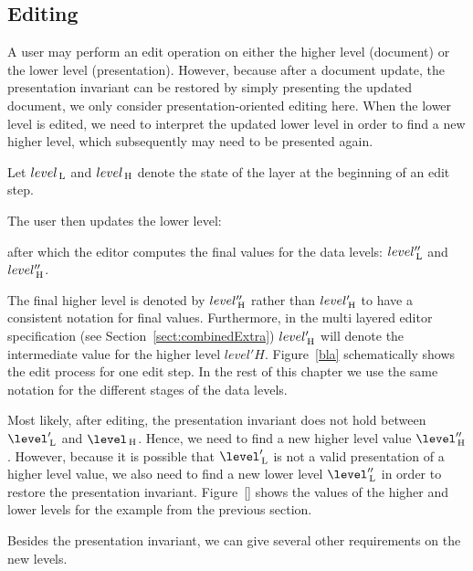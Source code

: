 

\subsection{Editing}\label{sect:single_Editing}

A user may perform an edit operation on either the higher level (document) or the lower level (presentation). However, because after a document update, the presentation invariant can be restored by simply presenting the updated document, we only consider presentation-oriented editing here. When the lower level is edited, we need to interpret the updated lower level in order to find a new higher level, which subsequently may need to be presented again.


Let $level_{\, \mathrm L}$ and $level_{\, \mathrm H}$ denote the state of the layer at the beginning of an edit step. 


The user then updates the lower level:


after which the editor computes the final values for the data levels: $level''_{\, \mathrm L}$ and $level''_{\, \mathrm H}$.

The final higher level is denoted by $level''_{\, \mathrm H}$ rather than $level'_{\, \mathrm H}$ to have a consistent notation for final values. Furthermore, in the multi layered editor specification (see Section~\ref{sect:combinedExtra}) $level'_{\, \mathrm H}$ will denote the intermediate value for the higher level $level'H$. Figure~\ref{bla} schematically shows the edit process for one edit step. In the rest of this chapter we use the same notation for the different stages of the data levels.


Most likely, after editing, the presentation invariant does not hold between $\level'\L$ and $\level\H$. Hence, we need to find a new higher level value $\level''\H$. However, because it is possible that $\level'\L$ is not a valid presentation of a higher level value, we also need to find a new lower level $\level''\L$ in order to restore the presentation invariant. Figure~\ref{} shows the values of the higher and lower levels for the example from the previous section.

Besides the presentation invariant, we can give several other requirements on the new levels.

